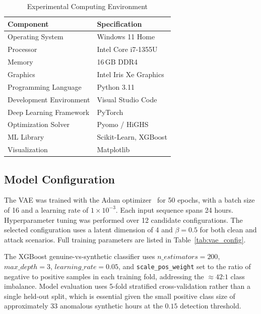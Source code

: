 \documentclass[journal]{IEEEtran}
\begin{document}
\begin{table}[!t]
\centering
\caption{Experimental Computing Environment}
\label{tab:hardware}
\begin{tabular}{ll}
\hline
\textbf{Component} & \textbf{Specification} \\
\hline
Operating System        & Windows 11 Home \\
Processor               & Intel Core i7-1355U \\
Memory                  & 16\,GB DDR4 \\
Graphics                & Intel Iris Xe Graphics \\
Programming Language    & Python 3.11 \\
Development Environment & Visual Studio Code \\
Deep Learning Framework & PyTorch \\
Optimization Solver     & Pyomo / HiGHS \\
ML Library              & Scikit-Learn, XGBoost \\
Visualization           & Matplotlib \\
\hline
\end{tabular}
\end{table}

\subsection{Model Configuration}
The VAE was trained with the Adam optimizer~\cite{Adam} for 50 epochs, with a batch size of 16 and a learning rate of $1\times10^{-3}$. Each input sequence spans 24 hours. Hyperparameter tuning was performed over 12 candidate configurations. The selected configuration uses a latent dimension of 4 and $\beta = 0.5$ for both clean and attack scenarios. Full training parameters are listed in Table~\ref{tab:vae_config}.

The XGBoost genuine-vs-synthetic classifier uses $n\_estimators = 200$, $max\_depth = 3$, $learning\_rate = 0.05$, and \texttt{scale\_pos\_weight} set to the ratio of negative to positive samples in each training fold, addressing the ${\approx}42$:$1$ class imbalance. Model evaluation uses 5-fold stratified cross-validation rather than a single held-out split, which is essential given the small positive class size of approximately 33 anomalous synthetic hours at the $0.15$ detection threshold.
\end{document}

